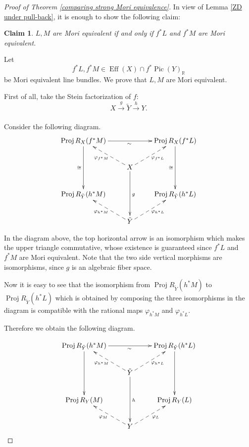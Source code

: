 \documentclass[12pt,twoside]{amsart}
\newtheorem*{claim}{Claim}
\theoremstyle{definition}
\newcommand\Pic{\mathop{\mathrm{Pic}}\nolimits}
\newcommand\Eff{\mathop{\mathrm{Eff}}\nolimits}
\newcommand\Proj{\mathop{\mathrm{Proj}}}
\newcommand\br{\mathbb{R}}
\begin{document}
\begin{proof}[Proof of Theorem \ref{comparing strong Mori equivalence}]
In view of Lemma \ref{ZD under pull-back}, it is enough to show the following claim:
\begin{claim}\label{comparing Mori equivalence}
$L, M$ are Mori equivalent if and only if $f^{*}L$ and $f^{*}M$ are
Mori equivalent.
\end{claim}

Let
\begin{equation*}
f^{*}L,f^{*}M\in\Eff{(X)}\cap f^{*}\Pic{(Y)}_{\br}
\end{equation*}
be Mori equivalent line bundles.
We prove that $L,M$ are Mori equivalent.

First of all, take the Stein factorization of $f$:
\begin{equation*}
X\xrightarrow[]{g}\tilde{Y}\xrightarrow[]{h}Y.
\end{equation*}

Consider the following diagram.
\[
\xymatrix{
\Proj{R_{X}(f^{*}M)} \ar[rr]_{\sim} \ar[dd]_{\cong} & & \Proj{R_{X}(f^{*}L)} \ar[dd]_{\cong}\\
& X \ar@{-->}[lu]^{\varphi_{f^{*}M}} \ar@{-->}[ru]_{\varphi_{f^{*}L}} \ar[dd]^{g}& \\
\Proj{R_{\tilde{Y}}(h^{*}M)}   & & \Proj{R_{\tilde{Y}}(h^{*}L)} \\
& \tilde{Y} \ar@{-->}[lu]^{\varphi_{h^{*}M}} \ar@{-->}[ru]_{\varphi_{h^{*}L}} & \\}\]

In the diagram above, the top horizontal arrow is an isomorphism which makes the
upper triangle commutative, whose existence is guaranteed since $f^*L$ and $f^*M$ are
Mori equivalent.
Note that the two side vertical morphisms are isomorphisms, since $g$ is an
algebraic fiber space.

Now it is easy to see that the isomorphism
from $\Proj{R_{\tilde{Y}}(h^{*}M)}$ to $\Proj{R_{\tilde{Y}}(h^{*}L)}$ which is obtained by
composing the three isomorphisms in the diagram is compatible with the rational maps
$\varphi_{h^*M}$ and $\varphi_{h^*L}$.

Therefore we obtain the following diagram.

\[
\xymatrix{
\Proj{R_{\tilde{Y}}(h^{*}M)} \ar[rr]_{\sim} \ar[dd] & & \Proj{R_{\tilde{Y}}(h^{*}L)}  \ar[dd]\\
& \tilde{Y} \ar@{-->}[lu]^{\varphi_{h^{*}M}} \ar@{-->}[ru]_{\varphi_{h^{*}L}} \ar[dd]^{h}& \\
\Proj{R_{Y}(M)}   & & \Proj{R_{Y}(L)} \\
& Y \ar@{-->}[lu]^{\varphi_{M}} \ar@{-->}[ru]_{\varphi_{L}} & \\}\]


\end{proof}
\end{document}
